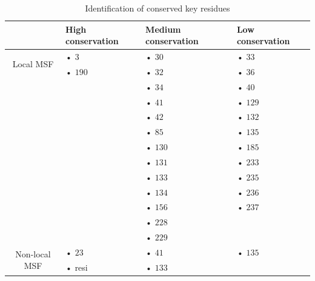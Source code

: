 \begin{table}[h!]
	\begin{tabular}{cp{4cm}p{5cm}p{4.5cm}}
		\hline
		\hline
		& High conservation & Medium conservation & Low conservation \\
		\hline
		\multirow{2}{*}{Local MSF} & •   $3$ & •  $30$ & • $33$ \\
		                           & • $190$ & •  $32$ & • $36$ \\
		                           &         & •  $34$ & • $40$ \\
		                           &         & •  $41$ & • $129$ \\
		                           &         & •  $42$ & • $132$ \\
		                           &         & •  $85$ & • $135$ \\
		                           &         & • $130$ & • $185$ \\
		                           &         & • $131$ & • $233$ \\
		                           &         & • $133$ & • $235$ \\
		                           &         & • $134$ & • $236$ \\
		                           &         & • $156$ & • $237$ \\
		                           &         & • $228$\\
		                           &         & • $229$\\
		\hline
		\multirow{2}{*}{Non-local MSF} & • $23$ & • $41$ & • $135$ \\
		                               & • resi & • $133$ &  \\
		\hline
		\hline
	\end{tabular}
	\caption{Identification of conserved key residues}
	\label{Final table}
\end{table}
